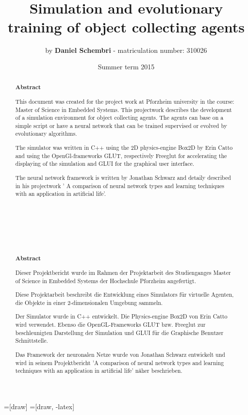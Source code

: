 \documentclass[10pt,a4paper,DIV=11]{scrreprt}
\title
{
    Simulation and evolutionary training of object collecting agents\\
}
\author
{
    by \textbf{Daniel Schembri} - matriculation number: 310026
}
\date
{
    Summer term 2015
}
\begin{document}
=[draw]
=[draw, -latex] 


\maketitle
\thispagestyle{empty}
\newpage
{\large\tableofcontents}
\newpage

% 
%
%
%
%
\begin{abstract} 
\huge{\textbf{Abstract}} \\

\normalsize

This document was created for the project work at Pforzheim university in the course: Master of Science in Embedded Systems. 
This projectwork describes the development of a simulation environment for object collecting agents. The agents can base on a simple script or have a neural network that can be trained supervised or evolved by evolutionary algorithms.

The simulator was written in C++ using the 2D physics-engine Box2D by Erin Catto and using the OpenGl-frameworks GLUT, respectively Freeglut for accelerating the displaying of the simulation and GLUI for the graphical user interface. 

The neural network framework is written by Jonathan Schwarz and detaily described in his projectwork ' A comparison of neural network types and learning techniques with an application in artificial life'. \\ \\ \\ \\ \\ \\ \\ \\

\huge{\textbf{Abstract}} \\

\normalsize

Dieser Projektbericht wurde im Rahmen der Projektarbeit des Studienganges Master of Science in Embedded Systems der Hochschule Pforzheim angefertigt. 

Diese Projektarbeit beschreibt die Entwicklung eines Simulators für virtuelle Agenten, die Objekte in einer 2-dimensionalen Umgebung sammeln. 

Der Simulator wurde in C++ entwickelt. Die Physics-engine Box2D von Erin Catto wird verwendet. Ebenso die OpenGL-Frameworks GLUT bzw. Freeglut zur beschleunigten Darstellung der Simulation und GLUI für die Graphische Benutzer Schnittstelle. 

Das Framework der neuronalen Netze wurde von Jonathan Schwarz entwickelt und wird in seinem Projektbericht 'A comparison of neural network types and learning techniques with an application in artificial life' näher beschrieben.
	
	
\end{abstract}
\end{document}
